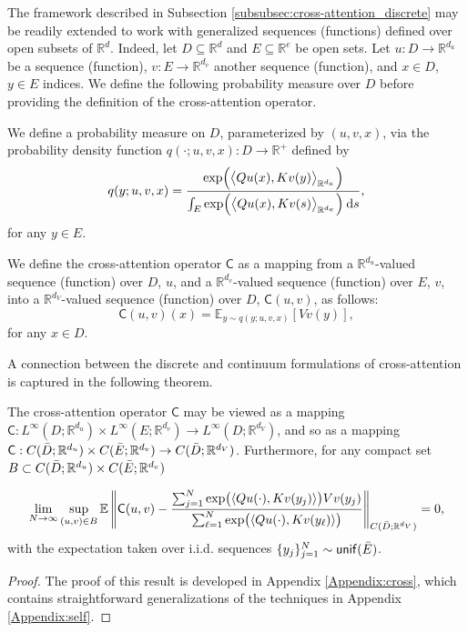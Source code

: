 \documentclass[twoside]{article}
\newcommand{\1}{\mathbbm{1}}
\newcommand{\R}{\mathbbm{R}}
\newcommand{\sC}{\mathsf{C}}
\newcommand{\dK}{d_\textrm{\scalebox{.7}{$K$}}}
\providecommand{\mathbbm}{\mathbb} %
\newcommand{\E}{\mathbb{E}}
\newcommand{\unif}{\mathsf{unif}}
\begin{document}
The framework described in Subsection \ref{subsubsec:cross-attention_discrete} may be readily extended to work with generalized sequences (functions) defined over open subsets of $\R^d$. Indeed, let $D \subseteq \R^d$ and $E \subseteq \R^e$ be open sets. Let $u: D \to \R^{d_u}$ be a sequence (function),
$v: E \to \R^{d_v}$ another sequence (function), and $x \in D$, $y \in E$ indices. We define the following probability measure over $D$ before providing the definition of the cross-attention operator.

\begin{definition}
\label{d:7}
We define a probability measure on $D$, parameterized by $(u,v,x)$, via the probability density function
$q(\cdot;u,v,x): D \to \R^+$ defined by
\[q(y; u,v, x) = \frac{\mathrm{exp} \Big ( \big\langle Q u(x), K v(y) \big\rangle_{\R^{\dK}} \Big )}{\int_{E} \mathrm{exp} \Big ( \big\langle Q u(x), K v(s) \big\rangle_{\R^{\dK}} \Big ) \: \mathrm{d}s},\]
for any $y \in {E}$.
\end{definition}

\begin{definition}
\label{d:8}
We define the cross-attention operator $\sC$ as a mapping from a $\R^{d_u}$-valued sequence (function) over $D$, $u$, 
and a $\R^{d_v}$-valued sequence (function) over $E$, $v$, into a $\R^{d_V}$-valued sequence (function) over $D$, $\sC(u,v)$, as follows:
\[\sC(u,v)(x) = \E_{y \sim q(y;u,v,x)} [V v(y)],\]
for any $x\in D$.
\end{definition}

A connection between the discrete and continuum formulations of cross-attention is captured in the following theorem.

\begin{theorem}
\label{thm:cross_attention_limit}
    The cross-attention operator $\sC$ may be viewed as a mapping $\sC:L^{\infty} (D;\R^{d_u})\times L^{\infty}(E;\R^{d_v}) \to L^{\infty} (D;\R^{d_V})$, and so as a mapping $\sC: C(\Bar{D};\R^{d_u})\times C(\Bar{E};\R^{d_v})\to C(\Bar{D};\R^{d_V})$. Furthermore, for any compact set $B\subset C(\Bar{D};\R^{d_u})\times C(\Bar{E};\R^{d_v})$

    \[ \lim_{N \to \infty} \sup_{(u,v) \in B} \E \left \| \sC(u,v) - \frac{\sum_{j=1}^N \mathrm{exp} \big ( \langle Qu(\cdot), Kv(y_j)  \rangle \big ) V v(y_j)}{\sum_{\ell=1}^N \mathrm{exp} \big ( \langle Qu(\cdot), Kv(y_\ell)  \rangle \big )} \right \|_{C(\Bar{D};\R^{d_V})}  = 0,\]
    with the expectation taken over i.i.d. sequences \(\{y_j\}_{j=1}^N \sim \unif(\Bar{E})\).

\end{theorem}
\begin{proof}
    The proof of this result is developed in Appendix \ref{Appendix:cross}, which contains straightforward generalizations of the techniques in Appendix \ref{Appendix:self}.
\end{proof}
\end{document}

